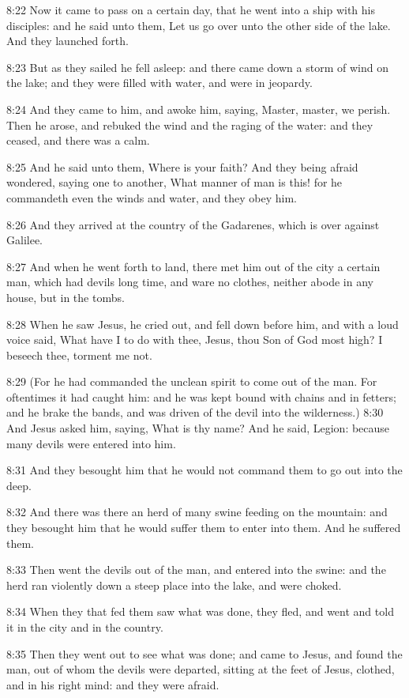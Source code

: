 8:22 Now it came to pass on a certain day, that he went into a ship with his disciples: and he said unto them, Let us go over unto the other side of the lake. And they launched forth.

8:23 But as they sailed he fell asleep: and there came down a storm of wind on the lake; and they were filled with water, and were in jeopardy.

8:24 And they came to him, and awoke him, saying, Master, master, we perish. Then he arose, and rebuked the wind and the raging of the water: and they ceased, and there was a calm.

8:25 And he said unto them, Where is your faith? And they being afraid wondered, saying one to another, What manner of man is this! for he commandeth even the winds and water, and they obey him.

8:26 And they arrived at the country of the Gadarenes, which is over against Galilee.

8:27 And when he went forth to land, there met him out of the city a certain man, which had devils long time, and ware no clothes, neither abode in any house, but in the tombs.

8:28 When he saw Jesus, he cried out, and fell down before him, and with a loud voice said, What have I to do with thee, Jesus, thou Son of God most high? I beseech thee, torment me not.

8:29 (For he had commanded the unclean spirit to come out of the man.  For oftentimes it had caught him: and he was kept bound with chains and in fetters; and he brake the bands, and was driven of the devil into the wilderness.)  8:30 And Jesus asked him, saying, What is thy name? And he said, Legion: because many devils were entered into him.

8:31 And they besought him that he would not command them to go out into the deep.

8:32 And there was there an herd of many swine feeding on the mountain: and they besought him that he would suffer them to enter into them. And he suffered them.

8:33 Then went the devils out of the man, and entered into the swine: and the herd ran violently down a steep place into the lake, and were choked.

8:34 When they that fed them saw what was done, they fled, and went and told it in the city and in the country.

8:35 Then they went out to see what was done; and came to Jesus, and found the man, out of whom the devils were departed, sitting at the feet of Jesus, clothed, and in his right mind: and they were afraid.

